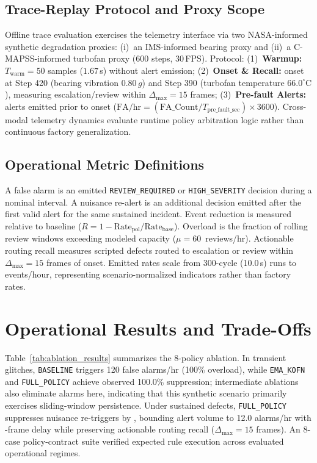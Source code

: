 \documentclass[conference]{IEEEtran}
\begin{document}
\subsection{Trace-Replay Protocol and Proxy Scope}
Offline trace evaluation exercises the telemetry interface via two NASA-informed synthetic degradation proxies: (i)~an IMS-informed bearing proxy and (ii)~a C-MAPSS-informed turbofan proxy (600 steps, 30\,FPS). Protocol: (1)~\textbf{Warmup:} $T_{\mathrm{warm}} = 50$ samples ($1.67$\,s) without alert emission; (2)~\textbf{Onset \& Recall:} onset at Step 420 (bearing vibration $0.80\,g$) and Step 390 (turbofan temperature $66.0^{\circ}\mathrm{C}$), measuring escalation/review within $\Delta_{\max} = 15$ frames; (3)~\textbf{Pre-fault Alerts:} alerts emitted prior to onset ($\mathrm{FA/hr} = (\mathrm{FA\_Count} / T_{\mathrm{pre\_fault\_sec}}) \times 3600$). Cross-modal telemetry dynamics evaluate runtime policy arbitration logic rather than continuous factory generalization.

\subsection{Operational Metric Definitions}
A false alarm is an emitted \texttt{REVIEW\_REQUIRED} or \texttt{HIGH\_SEVERITY} decision during a nominal interval. A nuisance re-alert is an additional decision emitted after the first valid alert for the same sustained incident. Event reduction is measured relative to baseline ($R = 1 - \mathrm{Rate}_{\mathrm{pol}}/\mathrm{Rate}_{\mathrm{base}}$). Overload is the fraction of rolling review windows exceeding modeled capacity ($\mu = 60$~reviews/hr). Actionable routing recall measures scripted defects routed to escalation or review within $\Delta_{\max} = 15$ frames of onset. Emitted rates scale from 300-cycle (10.0\,s) runs to events/hour, representing scenario-normalized indicators rather than factory rates.

\section{Operational Results and Trade-Offs}
Table~\ref{tab:ablation_results} summarizes the 8-policy ablation. In transient glitches, \texttt{BASELINE} triggers 120 false alarms/hr (100\% overload), while \texttt{EMA\_KOFN} and \texttt{FULL\_POLICY} achieve observed 100.0\% suppression; intermediate ablations also eliminate alarms here, indicating that this synthetic scenario primarily exercises sliding-window persistence. Under sustained defects, \texttt{FULL\_POLICY} suppresses nuisance re-triggers by \SustainedSuppressionFull{}, bounding alert volume to 12.0 alarms/hr with \SustainedMedianDelay{}-frame delay while preserving \SustainedIncidentRoutingRecall{} actionable routing recall ($\Delta_{\max} = 15$ frames). An 8-case policy-contract suite verified expected rule execution across evaluated operational regimes.
\end{document}
